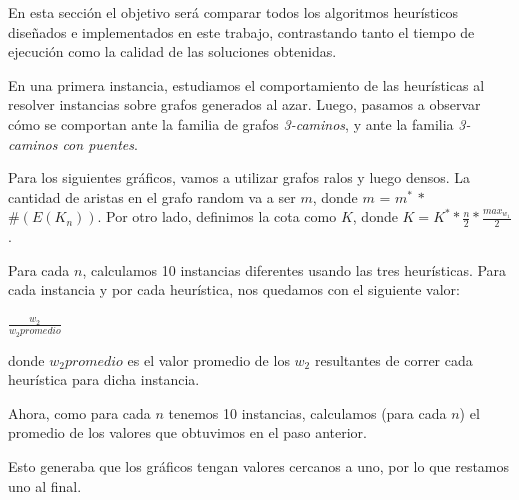 En esta sección el objetivo será comparar todos los algoritmos heurísticos diseñados e implementados en este trabajo, contrastando tanto el tiempo de ejecución como la calidad de las soluciones obtenidas.


En una primera instancia, estudiamos el comportamiento de las heurísticas al resolver instancias sobre grafos generados al azar. Luego, pasamos a observar cómo se comportan ante la familia de grafos \emph{3-caminos}, y ante la familia \emph{3-caminos con puentes}.

Para los siguientes gráficos, vamos a utilizar grafos ralos y luego densos. La cantidad de aristas en el grafo random va a ser $m$, donde $m$ = $m^*$ $*$ $\#(E(K_n))$. Por otro lado, definimos la cota como $K$, donde $K = K^* * \frac{n}{2} * \frac{max_{w_1}}{2}$. 


Para cada $n$, calculamos 10 instancias diferentes usando las tres heurísticas. Para cada instancia y por cada heurística, nos quedamos con el siguiente valor:

\begin{center}
$\frac{w_2}{w_2 promedio}$
\end{center}

donde $w_2 promedio$ es el valor promedio de los $w_2$ resultantes de correr cada heurística para dicha instancia.

Ahora, como para cada $n$ tenemos 10 instancias, calculamos (para cada $n$) el promedio de los valores que obtuvimos en el paso anterior.

Esto generaba que los gráficos tengan valores cercanos a uno, por lo que restamos uno al final.

